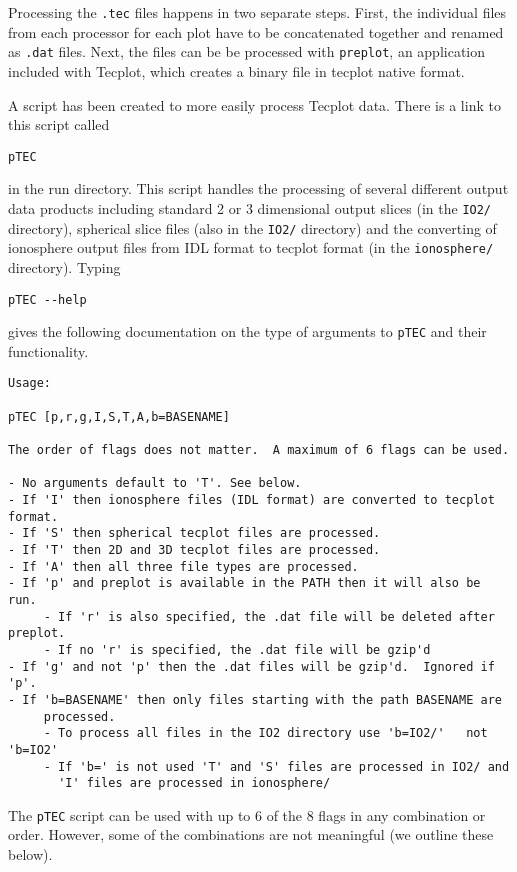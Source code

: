 Processing the {\tt .tec} files happens in two separate steps.  First,
the individual files from each processor for each plot have to be 
concatenated together and renamed as {\tt .dat} files.  Next, the
files can be be processed with {\tt preplot}, an application
included with Tecplot, which creates a binary file in tecplot native format.

A script has been created to more easily process Tecplot data.  There
is a link to this script called 
\begin{verbatim}
pTEC
\end{verbatim}
in the run directory.  This script handles the processing of several
different output data products including standard 2 or 3 dimensional
output slices (in the {\tt IO2/} directory), spherical slice files
(also in the {\tt IO2/} directory) and the converting of ionosphere
output files from IDL format to tecplot format (in the {\tt ionosphere/}
directory).  Typing
\begin{verbatim}
pTEC --help
\end{verbatim}
gives the following documentation on the type of arguments to {\tt pTEC} 
and their functionality.
\begin{verbatim}
Usage:

pTEC [p,r,g,I,S,T,A,b=BASENAME]

The order of flags does not matter.  A maximum of 6 flags can be used.       

- No arguments default to 'T'. See below.                                    
- If 'I' then ionosphere files (IDL format) are converted to tecplot format. 
- If 'S' then spherical tecplot files are processed.                         
- If 'T' then 2D and 3D tecplot files are processed.                         
- If 'A' then all three file types are processed.                            
- If 'p' and preplot is available in the PATH then it will also be run.      
     - If 'r' is also specified, the .dat file will be deleted after preplot.
     - If no 'r' is specified, the .dat file will be gzip'd                  
- If 'g' and not 'p' then the .dat files will be gzip'd.  Ignored if 'p'.    
- If 'b=BASENAME' then only files starting with the path BASENAME are        
     processed.                                                              
     - To process all files in the IO2 directory use 'b=IO2/'   not 'b=IO2'  
     - If 'b=' is not used 'T' and 'S' files are processed in IO2/ and       
       'I' files are processed in ionosphere/                                
\end{verbatim}
The {\tt pTEC} script can be used with up to 6 of the 8 flags in any
combination or order.  However, some of the combinations are not
meaningful (we outline these below).

